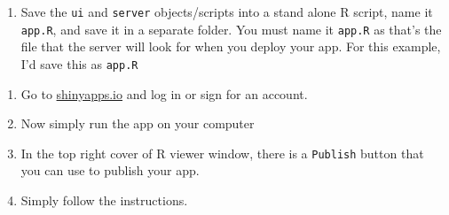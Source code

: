 \documentclass[
]{book}
\newenvironment{Shaded}{\begin{snugshade}}{\end{snugshade}}
\newcommand{\ControlFlowTok}[1]{\textcolor[rgb]{0.13,0.29,0.53}{\textbf{#1}}}
\newcommand{\DataTypeTok}[1]{\textcolor[rgb]{0.13,0.29,0.53}{#1}}
\newcommand{\DecValTok}[1]{\textcolor[rgb]{0.00,0.00,0.81}{#1}}
\newcommand{\KeywordTok}[1]{\textcolor[rgb]{0.13,0.29,0.53}{\textbf{#1}}}
\newcommand{\NormalTok}[1]{#1}
\newcommand{\OperatorTok}[1]{\textcolor[rgb]{0.81,0.36,0.00}{\textbf{#1}}}
\newcommand{\StringTok}[1]{\textcolor[rgb]{0.31,0.60,0.02}{#1}}
\providecommand{\tightlist}{%
  \setlength{\itemsep}{0pt}\setlength{\parskip}{0pt}}
\begin{document}
\begin{enumerate}
\def\labelenumi{\arabic{enumi}.}
\tightlist
\item
  Save the \texttt{ui} and \texttt{server} objects/scripts into a stand alone R script, name it \texttt{app.R}, and save it in a separate folder. You must name it \texttt{app.R} as that's the file that the server will look for when you deploy your app. For this example, I'd save this as \texttt{app.R}
\end{enumerate}

\begin{Shaded}
\end{Shaded}

\begin{enumerate}
\def\labelenumi{\arabic{enumi}.}
\setcounter{enumi}{1}
\tightlist
\item
  Go to \href{https://www.shinyapps.io}{shinyapps.io} and log in or sign for an account.
\item
  Now simply run the app on your computer
\item
  In the top right cover of R viewer window, there is a \texttt{Publish} button that you can use to publish your app.
\item
  Simply follow the instructions.
\end{enumerate}
\end{document}

